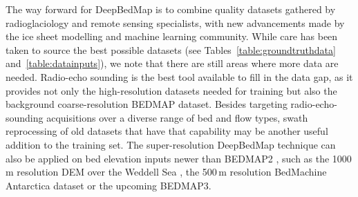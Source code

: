 \documentclass[tc, noline]{copernicus}
\begin{document}
The way forward for DeepBedMap is to combine quality datasets gathered by radioglaciology and remote sensing specialists, with new advancements made
by the ice sheet modelling and machine learning community. While care has been taken to source the best possible datasets (see
Tables~\ref{table:groundtruthdata} and~\ref{table:datainputs}), we note that there are still areas where more data are needed. Radio-echo sounding is
the best tool available to fill in the data gap, as it provides not only the high-resolution datasets needed for training but also the background
coarse-resolution BEDMAP dataset. Besides targeting radio-echo-sounding acquisitions over a diverse range of bed and flow types, swath reprocessing
of old datasets that have that capability \citep{HolschuhLinkingpostglaciallandscapes2020} may be another useful addition to the training set. The
super-resolution DeepBedMap technique can also be applied on bed elevation inputs newer than BEDMAP2 \citep{FretwellBedmap2improvedice2013}, such as
the 1000\,\unit{m} resolution DEM over the Weddell Sea \citep{Jeofry1KmBedTopography2017}, the 500\,\unit{m} resolution BedMachine Antarctica dataset
\citep{MorlighemMEaSUREsBedMachineAntarctica2019} or the upcoming BEDMAP3.
\end{document}
